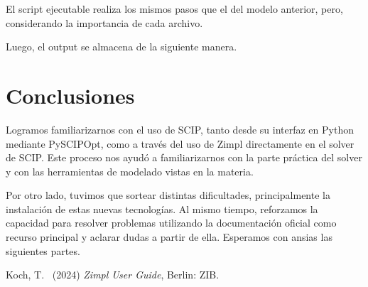 \documentclass[11pt, a4paper, pdftex]{article}
\begin{document}


\newpage

El script ejecutable realiza los mismos pasos que el del modelo anterior, pero, considerando 
la importancia de cada archivo.



\newpage

Luego, el output se almacena de la siguiente manera.




\section{Conclusiones}

Logramos familiarizarnos con el uso de SCIP, tanto desde su interfaz en
Python mediante PySCIPOpt, como a través del uso de Zimpl directamente
en el solver de SCIP. Este proceso nos ayudó a familiarizarnos con la
parte práctica del solver y con las herramientas de modelado vistas en
la materia.

Por otro lado, tuvimos que sortear distintas dificultades,
principalmente la instalación de estas nuevas tecnologías. Al mismo
tiempo, reforzamos la capacidad para resolver problemas utilizando la
documentación oficial como recurso principal y aclarar dudas a partir de
ella. Esperamos con ansias las siguientes partes.

\begin{thebibliography}{99}
	Koch, T.\
	(2024)
	\emph{Zimpl User Guide},
	Berlin: ZIB.
\end{thebibliography}
\end{document}
